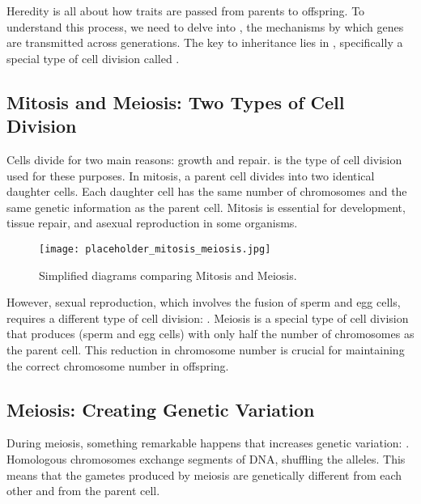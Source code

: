 Heredity is all about how traits are passed from parents to offspring.  To understand this process, we need to delve into , the mechanisms by which genes are transmitted across generations.  The key to inheritance lies in , specifically a special type of cell division called .

\subsection{Mitosis and Meiosis: Two Types of Cell Division}

Cells divide for two main reasons: growth and repair.   is the type of cell division used for these purposes. In mitosis, a parent cell divides into two identical daughter cells. Each daughter cell has the same number of chromosomes and the same genetic information as the parent cell. Mitosis is essential for development, tissue repair, and asexual reproduction in some organisms.

\begin{marginnote}
\end{marginnote}

\begin{figure}[htbp]
\centering
\texttt{[image: placeholder\_mitosis\_meiosis.jpg]}
\caption{Simplified diagrams comparing Mitosis and Meiosis.}
\end{figure}

However, sexual reproduction, which involves the fusion of sperm and egg cells, requires a different type of cell division: .  Meiosis is a special type of cell division that produces  (sperm and egg cells) with only half the number of chromosomes as the parent cell.  This reduction in chromosome number is crucial for maintaining the correct chromosome number in offspring.

\subsection{Meiosis: Creating Genetic Variation}

During meiosis, something remarkable happens that increases genetic variation: .  Homologous chromosomes exchange segments of DNA, shuffling the alleles. This means that the gametes produced by meiosis are genetically different from each other and from the parent cell.

